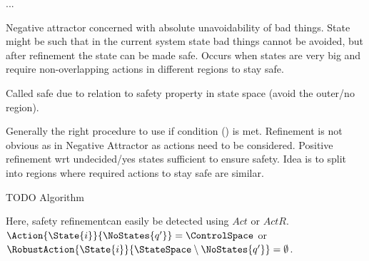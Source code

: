 ... %

    \startalgorithmic[numbering=no,margin=0em]
    \stopalgorithmic
    \startalgorithmic
                    \ELSE
                    \ENDIF
                \ENDFOR
            \ENDIF
        \ENDFOR
    \stopalgorithmic
\stopbuffer

\startsubsection[title={Safety}]


    Negative attractor concerned with absolute unavoidability of bad things.
    State might be such that in the current system state bad things cannot be avoided, but after refinement the state can be made safe.
    Occurs when states are very big and require non-overlapping actions in different regions to stay safe.

    Called safe due to relation to safety property in state space (avoid the outer/no region).

    Generally the right procedure to use if condition () is met.
    Refinement is not obvious as in Negative Attractor as actions need to be considered.
    Positive refinement wrt undecided/yes states sufficient to ensure safety.
    Idea is to split into regions where required actions to stay safe are similar.

    TODO Algorithm

    Here, safety refinementcan easily be detected using $Act$ or $ActR$.
    $\Action{\State{i}}{\NoStates{q'}} = \ControlSpace$ or $\RobustAction{\State{i}}{\StateSpace \setminus \NoStates{q'}} = \emptyset$.


